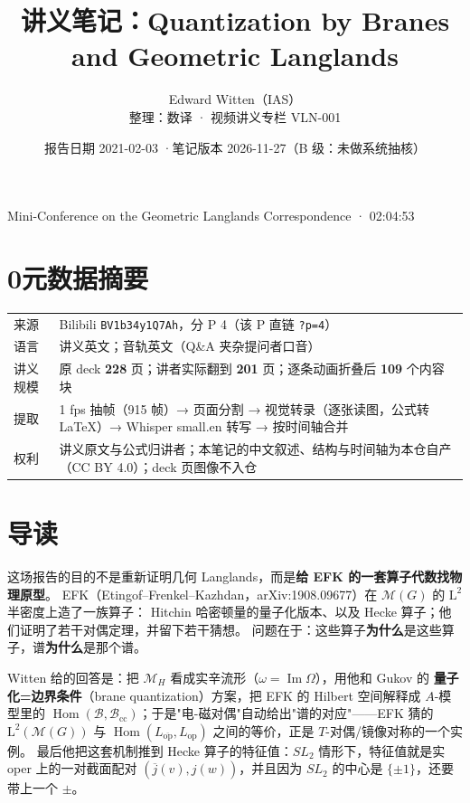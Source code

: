\documentclass[11pt,a4paper]{ctexart}
\title{\bfseries 讲义笔记：Quantization by Branes and Geometric Langlands}
\author{Edward Witten（IAS）\\[2pt]
\small 整理：数译 · 视频讲义专栏 VLN-001}
\date{报告日期 2021-02-03 \quad·\quad 笔记版本 2026-11-27（B 级：未做系统抽核）}
\newcommand{\Bcc}{\mathcal{B}_{\mathrm{cc}}}
\newcommand{\Loc}{\mathcal{M}_H}
\newcommand{\op}{\mathrm{op}}
\newcommand{\opb}{\overline{\mathrm{op}}}
\newcommand{\Hom}{\operatorname{Hom}}
\begin{document}
\maketitle
\vspace{-1.2em}
\begin{center}\small\color{black!60}
Mini-Conference on the Geometric Langlands Correspondence · 02:04:53
\end{center}

\section*{0\quad 元数据摘要}

\begin{center}\small
\begin{tabular}{@{}p{3.1cm}p{12.2cm}@{}}
\toprule
来源 & Bilibili \texttt{BV1b34y1Q7Ah}，分 P 4（该 P 直链 \texttt{?p=4}）\\
语言 & 讲义英文；音轨英文（Q\&A 夹杂提问者口音）\\
讲义规模 & 原 deck \textbf{228} 页；讲者实际翻到 \textbf{201} 页；逐条动画折叠后 \textbf{109} 个内容块\\
提取 & 1 fps 抽帧（915 帧）→ 页面分割 → 视觉转录（逐张读图，公式转 LaTeX）→ Whisper small.en 转写 → 按时间轴合并\\
权利 & 讲义原文与公式归讲者；本笔记的中文叙述、结构与时间轴为本仓自产（CC BY 4.0）；deck 页图像不入仓\\
\bottomrule
\end{tabular}
\end{center}

\section{导读}

这场报告的目的不是重新证明几何 Langlands，而是\textbf{给 EFK 的一套算子代数找物理原型}。
EFK（Etingof–Frenkel–Kazhdan，arXiv:1908.09677）在 $\mathcal{M}(G)$ 的 $\mathrm{L}^2$ 半密度上造了一族算子：
Hitchin 哈密顿量的量子化版本、以及 Hecke 算子；他们证明了若干对偶定理，并留下若干猜想。
问题在于：这些算子\textbf{为什么}是这些算子，谱\textbf{为什么}是那个谱。

Witten 给的回答是：把 $\Loc$ 看成实辛流形（$\omega=\operatorname{Im}\Omega$），用他和 Gukov 的
\textbf{量子化=边界条件}（brane quantization）方案，把 EFK 的 Hilbert 空间解释成 $A$-模型里的
$\Hom(\mathcal{B},\Bcc)$；于是"电-磁对偶"自动给出"谱的对应"——EFK 猜的
$\mathrm{L}^2(\mathcal{M}(G))$ 与 $\Hom(L_{\opb},L_{\op})$ 之间的等价，正是 $T$-对偶/镜像对称的一个实例。
最后他把这套机制推到 Hecke 算子的特征值：$SL_2$ 情形下，特征值就是实 oper 上的一对截面配对
$(\overline{j}(v),j(w))$，并且因为 $SL_2$ 的中心是 $\{\pm1\}$，还要带上一个 $\pm$。
\end{document}
